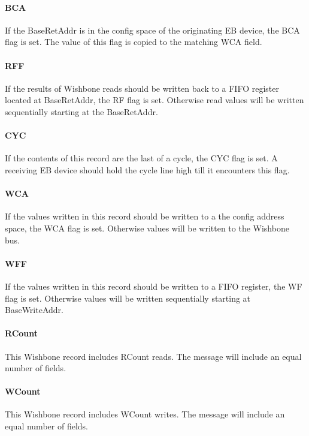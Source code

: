 \documentclass{article}
\begin{document}
\paragraph{BCA} \label{field:BCA}
If the BaseRetAddr is in the config space of the originating EB device,
the BCA flag is set.
The value of this flag is copied to the matching WCA field.

\paragraph{RFF} \label{field:RFF}
If the results of Wishbone reads should be written back to a FIFO register
located at BaseRetAddr, the RF flag is set.
Otherwise read values will be written sequentially starting at the
BaseRetAddr.

\paragraph{CYC} \label{field:CYC}
If the contents of this record are the last of a cycle,
the CYC flag is set.
A receiving EB device should hold the cycle line high till it encounters this flag.

\paragraph{WCA} \label{field:WCA}
If the values written in this record should be written to a the config
address space, the WCA flag is set.
Otherwise values will be written to the Wishbone bus.

\paragraph{WFF} \label{field:WFF}
If the values written in this record should be written to a FIFO register,
the WF flag is set.
Otherwise values will be written sequentially starting at BaseWriteAddr.

\paragraph{RCount} \label{field:RCount}
This Wishbone record includes RCount reads.
The message will include an equal number of  fields.

\paragraph{WCount} \label{field:WCount}
This Wishbone record includes WCount writes.
The message will include an equal number of  fields.
\end{document}
